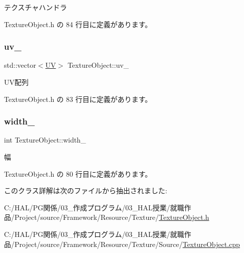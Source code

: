 テクスチャハンドラ 



 Texture\+Object.\+h の 84 行目に定義があります。

\mbox{\label{class_texture_object_a7339dcda7d43fe018b5334633412439a}} 
\subsubsection{\texorpdfstring{uv\+\_\+}{uv\_}}
{\footnotesize\ttfamily std\+::vector$<$\mbox{\hyperlink{class_texture_object_1_1_u_v}{UV}}$>$ Texture\+Object\+::uv\+\_\+\hspace{0.3cm}{\ttfamily [private]}}



U\+V配列 



 Texture\+Object.\+h の 83 行目に定義があります。

\mbox{\label{class_texture_object_a8e3d1b2b233672e0ea161b21d9c1cae0}} 
\subsubsection{\texorpdfstring{width\+\_\+}{width\_}}
{\footnotesize\ttfamily int Texture\+Object\+::width\+\_\+\hspace{0.3cm}{\ttfamily [private]}}



幅 



 Texture\+Object.\+h の 80 行目に定義があります。



このクラス詳解は次のファイルから抽出されました\+:\begin{DoxyCompactItemize}
\item 
C\+:/\+H\+A\+L/\+P\+G関係/03\+\_\+作成プログラム/03\+\_\+\+H\+A\+L授業/就職作品/\+Project/source/\+Framework/\+Resource/\+Texture/\mbox{\hyperlink{_texture_object_8h}{Texture\+Object.\+h}}\item 
C\+:/\+H\+A\+L/\+P\+G関係/03\+\_\+作成プログラム/03\+\_\+\+H\+A\+L授業/就職作品/\+Project/source/\+Framework/\+Resource/\+Texture/\+Source/\mbox{\hyperlink{_texture_object_8cpp}{Texture\+Object.\+cpp}}\end{DoxyCompactItemize}
